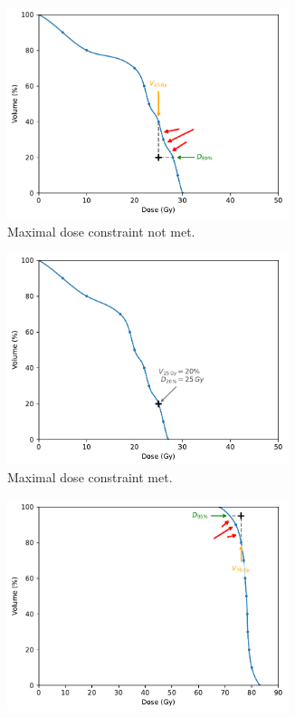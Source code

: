 \begin{figure}
	\centering
	\begin{subfigure}{0.32\textwidth}
		\centering
		\includegraphics[width=0.9\textwidth]{constraint_plot.pdf}
		\caption{Maximal dose constraint not met.}
		\label{fig:constraint_plot_unmet}
	\end{subfigure}
	\begin{subfigure}{0.32\textwidth}
		\centering
		\includegraphics[width=0.9\textwidth]{constraint_plot_met.pdf}
		\caption{Maximal dose constraint met.}
		\label{fig:constraint_plot_met}
	\end{subfigure}
	\begin{subfigure}{0.32\textwidth}
		\centering
		\includegraphics[width=0.9\textwidth]{constraint_plot_min.pdf}

\end{subfigure}
\end{figure}
